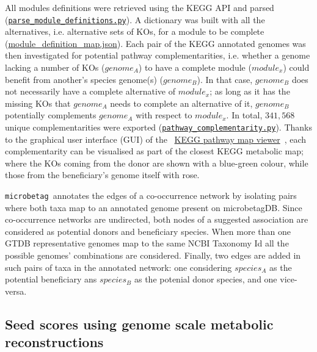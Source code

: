 \documentclass[sn-mathphys,Numbered, lineno]{sn-jnl}  %
\theoremstyle{thmstyleone}%
\theoremstyle{thmstyletwo}%
\theoremstyle{thmstylethree}%
\newcommand{\microbetag}{\texttt{microbetag }}
\begin{document}
        All modules definitions were retrieved using the KEGG API and parsed 
        (\href{https://github.com/hariszaf/microbetag/blob/develop/microbetagDB/mappings/kegg_mappings/parse_module_definitions.py}{\texttt{parse\_module\_definitions.py}}).
        A dictionary was built with all the alternatives, i.e. alternative sets of KOs, for a module to be complete 
        (\href{https://github.com/hariszaf/microbetag/blob/develop/microbetagDB/mappings/kegg_mappings/module_definition_map.json}{module\_definition\_map.json}).
        Each pair of the KEGG annotated genomes was then investigated for potential pathway complementarities, 
        i.e. whether a genome lacking a number of KOs ($genome_A$) to have a complete module ($module_x$) could benefit from another's species genome(s) ($genome_B$).
        In that case, $genome_B$ does not necessarily have a complete alternative of $module_x$; as long as it has the missing KOs that $genome_A$ needs to complete an alternative of it, $genome_B$ potentially complements $genome_A$ with respect to $module_x$.
        In total, $341,568$ unique complementarities were exported (\href{https://github.com/hariszaf/microbetag/blob/develop/microbetagDB/scripts/pathway_complementarity.py}{\texttt{pathway\_complementarity.py}}).
        Thanks to the graphical user interface (GUI) of the ~\href{https://www.kegg.jp/kegg/docs/color_gui.html}{KEGG pathway map viewer}~\cite{kanehisa2020kegg,kanehisa2022kegg}, 
        each complementarity can be visualised as part of the closest KEGG metabolic map; 
        where the KOs coming from the donor are shown with a blue-green colour, while those from the beneficiary's genome itself with rose.

        \microbetag annotates the edges of a co-occurrence network by isolating pairs where both taxa map to an annotated genome present on microbetagDB.
        Since co-occurrence networks are undirected, both nodes of a suggested association are considered as potential donors and beneficiary species. 
        When more than one GTDB representative genomes map to the same NCBI Taxonomy Id all the possible genomes' combinations are considered.
        Finally, two edges are added in such pairs of taxa in the annotated network: 
        one considering $species_A$ as the potential beneficiary ans $species_B$ as the potenial donor species, and one vice-versa. 


    \subsection*{ Seed scores using genome scale metabolic reconstructions }
    \label{subsec:seeds}
\end{document}
